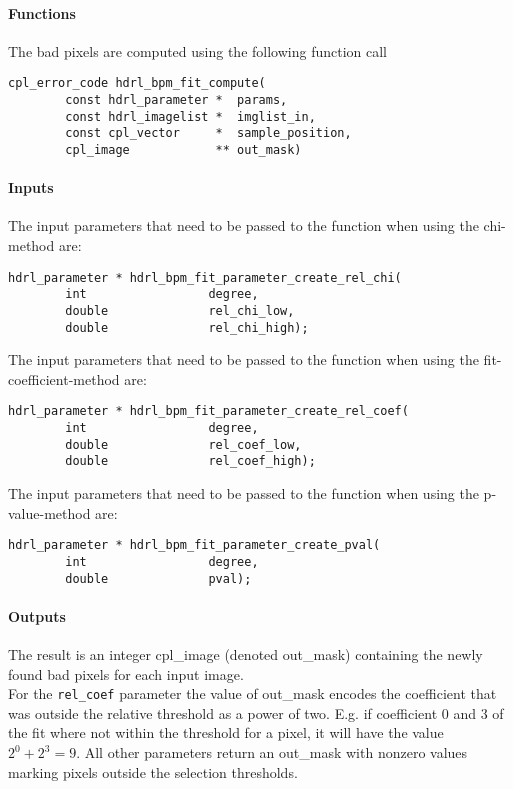 \paragraph{Functions}
The bad pixels are computed using the following function call

\begin{lstlisting}
cpl_error_code hdrl_bpm_fit_compute(
        const hdrl_parameter *  params,
        const hdrl_imagelist *  imglist_in,
        const cpl_vector     *  sample_position,
        cpl_image            ** out_mask)
\end{lstlisting}

\paragraph{Inputs}

The input parameters that need to be passed to the function when using
the chi-method are:
\begin{lstlisting}
hdrl_parameter * hdrl_bpm_fit_parameter_create_rel_chi(
        int                 degree,
        double              rel_chi_low,
        double              rel_chi_high);
\end{lstlisting}

The input parameters that need to be passed to the function when using
the fit-coefficient-method are:
\begin{lstlisting}
hdrl_parameter * hdrl_bpm_fit_parameter_create_rel_coef(
        int                 degree,
        double              rel_coef_low, 
        double              rel_coef_high);
\end{lstlisting}


The input parameters that need to be passed to the function when using
the p-value-method are:
\begin{lstlisting}
hdrl_parameter * hdrl_bpm_fit_parameter_create_pval(
        int                 degree, 
        double              pval);
\end{lstlisting}

\paragraph{Outputs}

The result is an integer cpl\_image (denoted out\_mask) containing the newly
found bad pixels for each input image.\\

For the \verb+rel_coef+ parameter the value of out\_mask encodes the
coefficient that was outside the relative threshold as a power of two.
E.g. if coefficient 0 and 3 of the fit where not within the threshold for a
pixel, it will have the value $2^0 + 2^3 = 9$.
All other parameters return an out\_mask with nonzero values marking pixels
outside the selection thresholds.

